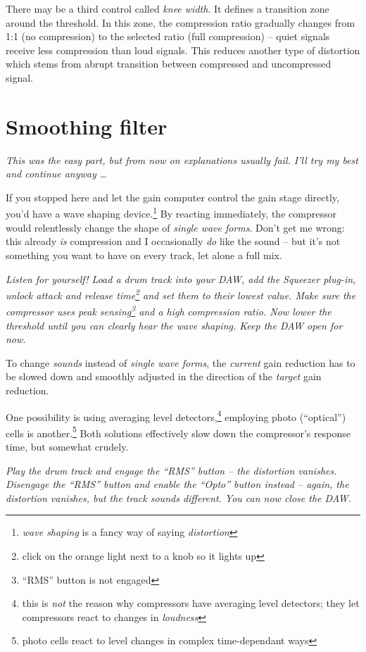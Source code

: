 There may be a third control called \emph{knee width}. It defines a
transition zone around the threshold.  In this zone, the compression
ratio gradually changes from 1:1 (no compression) to the selected
ratio (full compression) -- quiet signals receive less compression
than loud signals.  This reduces another type of distortion which
stems from abrupt transition between compressed and uncompressed
signal.

\section{Smoothing filter}
\label{sec:smoothing_filter}

\emph{This was the easy part, but from now on explanations usually
  fail.  I'll try my best and continue anyway \dots}

If you stopped here and let the gain computer control the gain stage
directly, you'd have a wave shaping device.\footnote{\emph{wave
    shaping} is a fancy way of saying \emph{distortion}} By reacting
immediately, the compressor would relentlessly change the shape of
\emph{single wave forms}.  Don't get me wrong: this already \emph{is}
compression and I occasionally \emph{do} like the sound -- but it's
not something you want to have on every track, let alone a full mix.

\emph{Listen for yourself!  Load a drum track into your DAW, add the
  Squeezer plug-in, unlock attack and release time\footnote{click on
    the orange light next to a knob so it lights up} and set them to
  their lowest value.  Make sure the compressor uses peak
  sensing\footnote{``RMS'' button is not engaged} and a high
  compression ratio.  Now lower the threshold until you can clearly
  hear the wave shaping.  Keep the DAW open for now.}

To change \emph{sounds} instead of \emph{single wave forms}, the
\emph{current} gain reduction has to be slowed down and smoothly
adjusted in the direction of the \emph{target} gain reduction.

One possibility is using averaging level detectors,\footnote{this is
  \emph{not} the reason why compressors have averaging level
  detectors; they let compressors react to changes in \emph{loudness}}
employing photo (``optical'') cells is another.\footnote{photo cells
  react to level changes in complex time-dependant ways} Both
solutions effectively slow down the compressor's response time, but
somewhat crudely.

\emph{Play the drum track and engage the ``RMS'' button -- the
  distortion vanishes.  Disengage the ``RMS'' button and enable the
  ``Opto'' button instead -- again, the distortion vanishes, but the
  track sounds different.  You can now close the DAW.}

